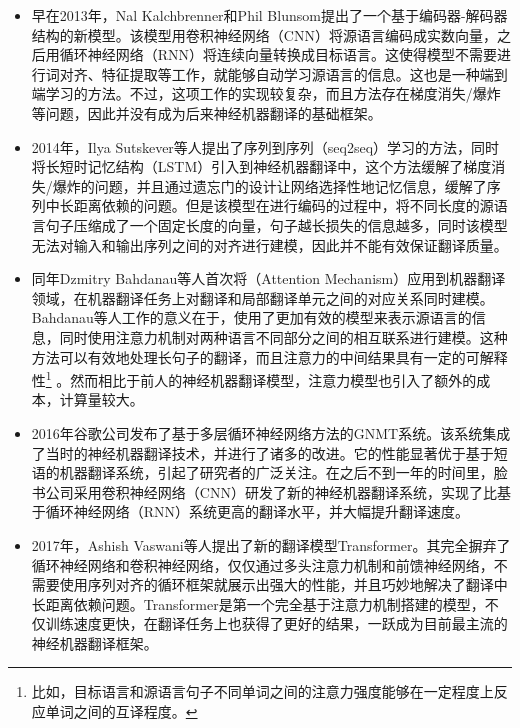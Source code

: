 \begin{itemize}
\vspace{0.3em}
\item 早在2013年，Nal Kalchbrenner和Phil Blunsom提出了一个基于编码器-解码器结构的新模型。该模型用卷积神经网络（CNN）将源语言编码成实数向量，之后用循环神经网络（RNN）将连续向量转换成目标语言。这使得模型不需要进行词对齐、特征提取等工作，就能够自动学习源语言的信息。这也是一种端到端学习的方法。不过，这项工作的实现较复杂，而且方法存在梯度消失/爆炸等问题，因此并没有成为后来神经机器翻译的基础框架。
\vspace{0.3em}
\item 2014年，Ilya Sutskever等人提出了序列到序列（seq2seq）学习的方法，同时将长短时记忆结构（LSTM）引入到神经机器翻译中，这个方法缓解了梯度消失/爆炸的问题，并且通过遗忘门的设计让网络选择性地记忆信息，缓解了序列中长距离依赖的问题。但是该模型在进行编码的过程中，将不同长度的源语言句子压缩成了一个固定长度的向量，句子越长损失的信息越多，同时该模型无法对输入和输出序列之间的对齐进行建模，因此并不能有效保证翻译质量。
\vspace{0.3em}
\item 同年Dzmitry Bahdanau等人首次将{\small{}}（Attention Mechanism）应用到机器翻译领域，在机器翻译任务上对翻译和局部翻译单元之间的对应关系同时建模。Bahdanau等人工作的意义在于，使用了更加有效的模型来表示源语言的信息，同时使用注意力机制对两种语言不同部分之间的相互联系进行建模。这种方法可以有效地处理长句子的翻译，而且注意力的中间结果具有一定的可解释性\footnote{比如，目标语言和源语言句子不同单词之间的注意力强度能够在一定程度上反应单词之间的互译程度。} 。然而相比于前人的神经机器翻译模型，注意力模型也引入了额外的成本，计算量较大。
\vspace{0.3em}
\item 2016年谷歌公司发布了基于多层循环神经网络方法的GNMT系统。该系统集成了当时的神经机器翻译技术，并进行了诸多的改进。它的性能显著优于基于短语的机器翻译系统，引起了研究者的广泛关注。在之后不到一年的时间里，脸书公司采用卷积神经网络（CNN）研发了新的神经机器翻译系统，实现了比基于循环神经网络（RNN）系统更高的翻译水平，并大幅提升翻译速度。
\vspace{-1.2em}
\item 2017年，Ashish Vaswani等人提出了新的翻译模型Transformer。其完全摒弃了循环神经网络和卷积神经网络，仅仅通过多头注意力机制和前馈神经网络，不需要使用序列对齐的循环框架就展示出强大的性能，并且巧妙地解决了翻译中长距离依赖问题。Transformer是第一个完全基于注意力机制搭建的模型，不仅训练速度更快，在翻译任务上也获得了更好的结果，一跃成为目前最主流的神经机器翻译框架。
\vspace{0.3em}
\end{itemize}

